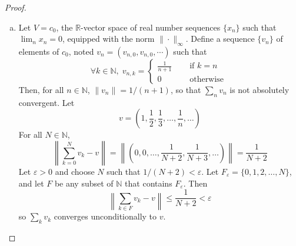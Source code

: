 \documentclass[11pt,a4paper,twoside]{article}
\theoremstyle{definition}
\begin{document}
\begin{proof}
\begin{enumerate}[(a)]
  \item Let $V = c_0$, the $\mathbb{R}$-vector space of real number sequences $\{ x_n \}$ such that $\lim_n x_n = 0$, equipped with the norm $\| \cdot \|_\infty$.
    Define a sequence $\{ v_n \}$ of elements of $c_0$, noted $v_n = (v_{n, 0}, v_{n, 0}, \cdots)$ such that
    \begin{equation*}
      \forall k \in \mathbb{N}, \; v_{n, k} = \begin{cases}
        \frac{1}{n + 1} &\quad\text{ if } k = n \\
        0 &\quad\text{ otherwise }
      \end{cases}
    \end{equation*}
    Then, for all $n \in \mathbb{N}$, $\| v_n \| = 1 / (n + 1)$, so that $\sum_n v_n$ is not absolutely convergent.
    Let
    \begin{equation*}
      v = \left( 1, \frac{1}{2}, \frac{1}{3}, \dotsc, \frac{1}{n}, \dotsc \right)
    \end{equation*}
    For all $N \in \mathbb{N}$,
    \begin{equation*}
      \left\| \sum_{k = 0}^N v_k - v \right\| = \left\| \left( 0, 0, \dotsc, \frac{1}{N + 2}, \frac{1}{N + 3}, \dotsc \right) \right\| = \frac{1}{N + 2}
    \end{equation*}
    Let $\varepsilon > 0$ and choose $N$ such that $1 / (N + 2) < \varepsilon$. Let $F_\varepsilon = \{ 0, 1, 2, \dotsc, N \}$, and let $F$
    be any subset of $\mathbb{N}$ that contains $F_\varepsilon$. Then
    \begin{equation*}
      \left\| \sum_{k \in F} v_k - v \right\| \leq \frac{1}{N + 2} < \varepsilon
    \end{equation*}
    so $\sum_k v_k$ converges unconditionally to $v$.

  \end{enumerate}

\end{proof}
\end{document}
